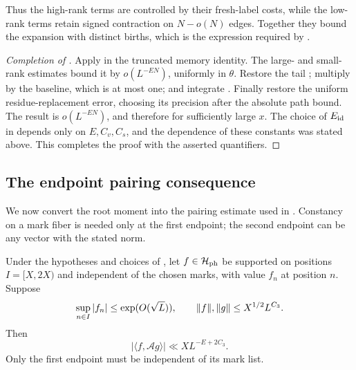Thus the high-rank terms are controlled by their fresh-label costs,
while the low-rank terms retain signed contraction on $N-o(N)$ edges.
Together they bound the expansion with distinct births, which is the
expression required by .

\begin{proof}[Completion of ]
Apply  in the truncated
memory identity.  The large- and small-rank estimates
bound it by $o(L^{-EN})$, uniformly in $\theta$.
Restore the tail ; multiply by
the baseline, which is at most one; and integrate
.  Finally restore the
uniform residue-replacement error, choosing its
precision after the absolute path bound.  The result
is $o(L^{-EN})$, and therefore
 for sufficiently large
$x$.  The choice of $E_{\rm id}$ in
 depends only
on $E,C_v,C_s$, and the dependence of these constants
was stated above.  This completes the proof with
the asserted quantifiers.
\end{proof}

\subsection{The endpoint pairing consequence}

We now convert the root moment into the pairing estimate used in
.  Constancy on a mark fiber is needed only at the first
endpoint; the second endpoint can be any vector with the stated norm.

\begin{corollary}\label{cor:transference-pairing}
Under the hypotheses and choices of
, let $f\in\mathcal H_{\rm ph}$
be supported on positions $I=[X,2X)$ and independent
of the chosen marks, with value $f_n$ at position $n$.
Suppose
\[
 \sup_{n\in I}|f_n|\le\exp(O(\sqrt L)),\qquad
 \lVert f\rVert,\lVert g\rVert\le X^{1/2}L^{C_3}.
\]
Then
\begin{equation}\label{eq:transference-pairing}
 |\langle f,\mathcal A g\rangle|
       \ll XL^{-E+2C_3}.
\end{equation}
Only the first endpoint must be independent of its
mark list.
\end{corollary}

